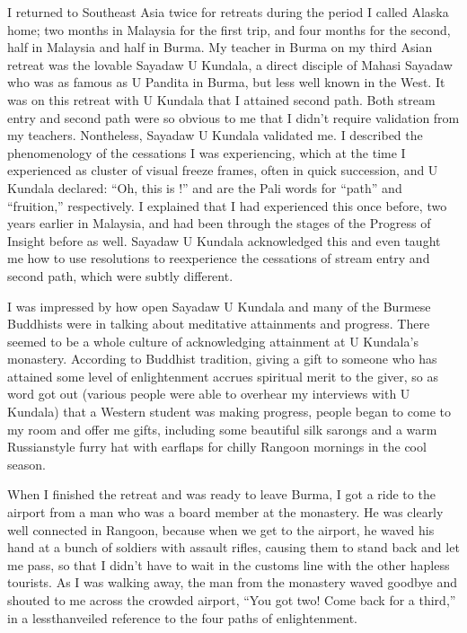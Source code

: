 \documentclass[a5paper,10pt,english]{book}
\begin{document}
\sphinxAtStartPar
I returned to Southeast Asia twice for retreats during the period I
called Alaska home; two months in Malaysia for the first trip, and four
months for the second, half in Malaysia and half in Burma. My teacher in
Burma on my third Asian retreat was the lovable Sayadaw U Kundala, a
direct disciple of Mahasi Sayadaw who was as famous as U Pandita in
Burma, but less well known in the West. It was on this retreat with U
Kundala that I attained second path. Both stream entry and second path
were so obvious to me that I didn’t require validation from my teachers.
Nontheless, Sayadaw U Kundala validated me. I described the
phenomenology of the
cessations I was experiencing, which at the time I experienced as
cluster of visual freeze frames, often in quick succession, and U
Kundala declared: “Oh, this is !”  and  are
the Pali words for “path” and “fruition,” respectively. I explained that
I had experienced this once before, two years earlier in Malaysia, and
had been through the stages of the Progress of Insight before as well.
Sayadaw U Kundala acknowledged this and even taught me how to use
resolutions to re\sphinxhyphen{}experience the cessations of stream entry and second
path, which were subtly different.

\sphinxAtStartPar
I was impressed by how open Sayadaw U Kundala and many of the Burmese
Buddhists were in talking about meditative attainments and progress.
There seemed to be a whole culture of acknowledging attainment at U
Kundala’s monastery. According to Buddhist tradition, giving a gift to
someone who has attained some level of enlightenment accrues spiritual
merit to the giver, so as word got out (various people were able to
overhear my interviews with U Kundala) that a Western student was making
progress, people began to come to my room and offer me gifts, including
some beautiful silk sarongs and a warm Russian\sphinxhyphen{}style furry hat with
earflaps for chilly Rangoon mornings in the cool season.

\sphinxAtStartPar
When I finished the retreat and was ready to leave Burma, I got a ride
to the airport from a man who was a board member at the monastery. He
was clearly well connected in Rangoon, because when we get to the
airport, he waved his hand at a bunch of soldiers with assault rifles,
causing them to stand back and let me pass, so that I didn’t have to
wait in the customs line with the other hapless tourists. As I was
walking away, the man from the monastery waved goodbye and shouted to me
across the crowded airport, “You got two! Come back for a third,” in a
less\sphinxhyphen{}than\sphinxhyphen{}veiled reference to the four paths of enlightenment.
\end{document}
